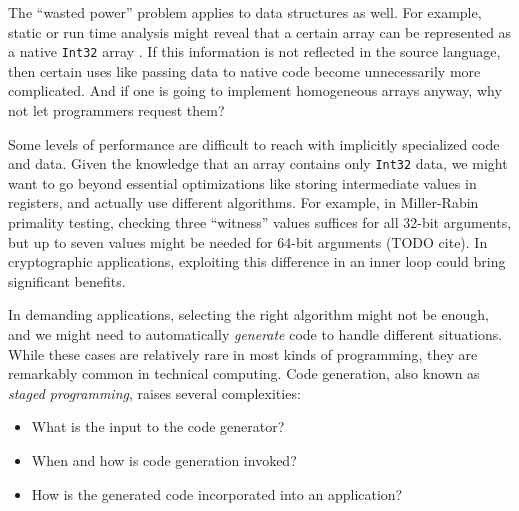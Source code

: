 The ``wasted power'' problem applies to data structures as well.
For example, static or run time analysis might reveal that a certain array
can be represented as a native \texttt{Int32} array \cite{Bolz2013}.
If this information is not reflected in the source language, then
certain uses like passing data to native code become unnecessarily more
complicated.
And if one is going to implement homogeneous arrays anyway, why not
let programmers request them?

Some levels of performance are difficult to reach with implicitly
specialized code and data. Given the knowledge that
an array contains only \texttt{Int32} data, we might want to go
beyond essential optimizations like storing intermediate values in
registers, and actually use different algorithms. For example,
in Miller-Rabin primality testing, checking three ``witness'' values
suffices for all 32-bit arguments, but up to seven values might be
needed for 64-bit arguments (TODO cite).
In cryptographic applications, exploiting this difference in an inner loop
could bring significant benefits.

In demanding applications, selecting the right algorithm might not
be enough, and we might need to automatically \emph{generate} code
to handle different situations. While these cases are relatively rare
in most kinds of programming, they are remarkably common in technical
computing. Code generation, also known as \emph{staged programming},
raises several complexities:

\vspace{-2ex}
\begin{singlespace}
\begin{itemize}
\item What is the input to the code generator?
\item When and how is code generation invoked?
\item How is the generated code incorporated into an application?
\end{itemize}
\end{singlespace}







